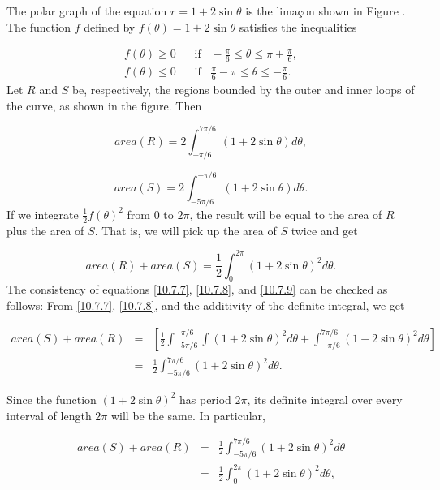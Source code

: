 \begin{example} The polar graph of the equation $r = 1 + 2 \sin \theta$ is the lima\c{c}on shown in Figure .
The function $f$ defined by $f(\theta) = 1 + 2 \sin \theta$ satisfies the inequalities

$$
\begin{array}{ll}
f(\theta) \geq 0 \;\;\;&\mbox{if} \;\;\; -\frac{\pi}{6} \leq \theta \leq \pi + \frac{\pi}{6}, \\
f(\theta) \leq 0 \;\;\;&\mbox{if} \;\;\;  \frac{\pi}{6} - \pi \leq \theta \leq - \frac{\pi}{6} .
\end{array}
$$
\noindent
Let $R$ and $S$ be, respectively,
the regions bounded by the outer and inner loops of the curve,
as shown in the figure.
Then

\begin{equation}
area(R) = 2\int_{-\pi/6}^{7\pi/6} (1 + 2 \sin \theta) d\theta,
\label{eq10.7.7}
\end{equation}

\begin{equation}
area(S) = 2\int_{-5\pi/6}^{-\pi/6} (1 + 2 \sin \theta) d\theta. 
\label{eq10.7.8}
\end{equation}
\noindent If we integrate $\frac{1}{2}f(\theta)^2$ from 0 to $2\pi$, the result will be equal to the area of $R$ plus the area of $S$. That is, we will pick up the area of $S$ twice and get

\begin{equation}
area(R) + area(S) = \frac{1}{2} \int_0^{2\pi} (1 + 2 \sin \theta)^2 d\theta.  
\label{eq10.7.9}
\end{equation}
\noindent The consistency of equations
\eqref{10.7.7},
\eqref{10.7.8},
and \eqref{10.7.9}
can be checked as follows:
From
\eqref{10.7.7},
\eqref{10.7.8},
and the additivity of the definite integral, we get

\begin{eqnarray*}
area(S) + area(R) 
&=& \left[ \frac{1}{2} \int_{-5\pi/6}^{-\pi/6} \int (1 + 2 \sin \theta)^2 d\theta + \int_{-\pi/6}^{7\pi/6} (1 + 2 \sin \theta)^2 d\theta \right] \\
&=& \frac{1}{2} \int_{-5\pi/6}^{7\pi/6} (1 + 2 \sin \theta)^2 d\theta.
\end{eqnarray*}

\noindent Since the function $(1 + 2 \sin \theta)^2$ has period $2\pi$, its definite integral over every interval of length $2\pi$ will be the same. In particular,

\begin{eqnarray*}
area(S) + area(R) 
&=& \frac{1}{2} \int_{-5\pi/6}^{7\pi/6}  (1 + 2 \sin \theta)^2 d\theta \\
&=& \frac{1}{2} \int_{0}^{2\pi} (1 + 2 \sin \theta)^2 d\theta,
\end{eqnarray*}


\end{example}
